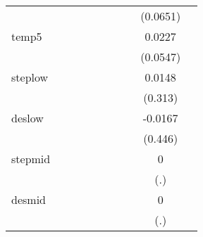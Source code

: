 {\begin{tabular}{l*{9}{c}}
            &                     &                     &                     &                     &                     &                     &                     &    (0.0651)         &                     \\
[1em]
temp5       &                     &                     &                     &                     &                     &                     &                     &      0.0227         &                     \\
            &                     &                     &                     &                     &                     &                     &                     &    (0.0547)         &                     \\
[1em]
steplow     &                     &                     &                     &                     &                     &                     &                     &      0.0148         &                     \\
            &                     &                     &                     &                     &                     &                     &                     &     (0.313)         &                     \\
[1em]
deslow      &                     &                     &                     &                     &                     &                     &                     &     -0.0167         &                     \\
            &                     &                     &                     &                     &                     &                     &                     &     (0.446)         &                     \\
[1em]
stepmid     &                     &                     &                     &                     &                     &                     &                     &           0         &                     \\
            &                     &                     &                     &                     &                     &                     &                     &         (.)         &                     \\
[1em]
desmid      &                     &                     &                     &                     &                     &                     &                     &           0         &                     \\
            &                     &                     &                     &                     &                     &                     &                     &         (.)         &                     \\

\end{tabular}}
